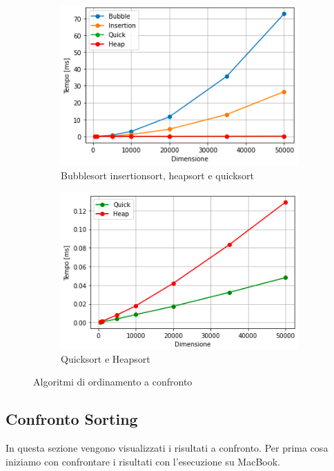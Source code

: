 \documentclass[12pt, a4paper]{report}
\begin{document}
\begin{figure}[ht]
 \centering
 \begin{subfigure}[t]{0.45\textwidth}
 \centering
 \includegraphics[width=\textwidth]{Img/GraficiSorting/Sorting1.png}
 \caption{Bubblesort insertionsort, heapsort e quicksort}
 \label{Fig:AllSortingAlg}
 \end{subfigure}
 \hfill
 \begin{subfigure}[t]{0.45\textwidth}
 \centering
 \includegraphics[width=\textwidth]{Img/GraficiSorting/Sorting2.png}
 \caption{Quicksort e Heapsort}
 \label{Fig:QHSort}
 \end{subfigure}

 \caption{Algoritmi di ordinamento a confronto}
 \label{Fig:AllSort}
\end{figure}


\subsection{Confronto Sorting}
In questa sezione vengono visualizzati i risultati a confronto. Per prima cosa iniziamo con confrontare i risultati con l'esecuzione su MacBook.
\end{document}
